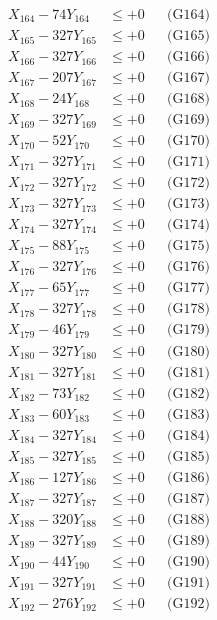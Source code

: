 \documentclass[a4paper,10pt]{article}
\begin{document}
{\begin{align}
X_{164} - 74Y_{164} &\leq +0 && \text{(G164)} \\
X_{165} - 327Y_{165} &\leq +0 && \text{(G165)} \\
X_{166} - 327Y_{166} &\leq +0 && \text{(G166)} \\
X_{167} - 207Y_{167} &\leq +0 && \text{(G167)} \\
X_{168} - 24Y_{168} &\leq +0 && \text{(G168)} \\
X_{169} - 327Y_{169} &\leq +0 && \text{(G169)} \\
X_{170} - 52Y_{170} &\leq +0 && \text{(G170)} \\
\allowbreak
X_{171} - 327Y_{171} &\leq +0 && \text{(G171)} \\
X_{172} - 327Y_{172} &\leq +0 && \text{(G172)} \\
X_{173} - 327Y_{173} &\leq +0 && \text{(G173)} \\
X_{174} - 327Y_{174} &\leq +0 && \text{(G174)} \\
X_{175} - 88Y_{175} &\leq +0 && \text{(G175)} \\
X_{176} - 327Y_{176} &\leq +0 && \text{(G176)} \\
X_{177} - 65Y_{177} &\leq +0 && \text{(G177)} \\
X_{178} - 327Y_{178} &\leq +0 && \text{(G178)} \\
X_{179} - 46Y_{179} &\leq +0 && \text{(G179)} \\
X_{180} - 327Y_{180} &\leq +0 && \text{(G180)} \\
\allowbreak
X_{181} - 327Y_{181} &\leq +0 && \text{(G181)} \\
X_{182} - 73Y_{182} &\leq +0 && \text{(G182)} \\
X_{183} - 60Y_{183} &\leq +0 && \text{(G183)} \\
X_{184} - 327Y_{184} &\leq +0 && \text{(G184)} \\
X_{185} - 327Y_{185} &\leq +0 && \text{(G185)} \\
X_{186} - 127Y_{186} &\leq +0 && \text{(G186)} \\
X_{187} - 327Y_{187} &\leq +0 && \text{(G187)} \\
X_{188} - 320Y_{188} &\leq +0 && \text{(G188)} \\
X_{189} - 327Y_{189} &\leq +0 && \text{(G189)} \\
X_{190} - 44Y_{190} &\leq +0 && \text{(G190)} \\
\allowbreak
X_{191} - 327Y_{191} &\leq +0 && \text{(G191)} \\
X_{192} - 276Y_{192} &\leq +0 && \text{(G192)} \\

\end{align}}
\end{document}
